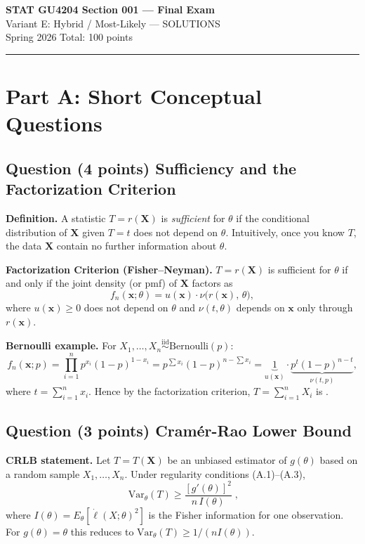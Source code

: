 \documentclass[11pt]{article}
\newcounter{qnum}
\newcommand{\question}[2]{\stepcounter{qnum}\subsection*{Question \theqnum \quad (#1 points) \hfill #2}}
\begin{document}
\begin{center}
{\LARGE\bfseries STAT GU4204 Section 001 --- Final Exam}\\[4pt]
{\large Variant E: Hybrid / Most-Likely \quad --- \quad SOLUTIONS}\\[6pt]
{\large Spring 2026 \hspace{1.5cm} Total: 100 points}
\end{center}

\bigskip
\hrule
\bigskip

\section*{Part A: Short Conceptual Questions}

\question{4}{Sufficiency and the Factorization Criterion}

\textbf{Definition.} A statistic $T = r(\mathbf{X})$ is \emph{sufficient} for $\theta$ if the conditional distribution of $\mathbf{X}$ given $T = t$ does not depend on $\theta$. Intuitively, once you know $T$, the data $\mathbf{X}$ contain no further information about $\theta$.

\textbf{Factorization Criterion (Fisher--Neyman).} $T = r(\mathbf{X})$ is sufficient for $\theta$ if and only if the joint density (or pmf) of $\mathbf{X}$ factors as
\[ f_n(\mathbf{x};\theta) = u(\mathbf{x}) \cdot \nu\bigl(r(\mathbf{x}),\,\theta\bigr), \]
where $u(\mathbf{x}) \ge 0$ does not depend on $\theta$ and $\nu(t,\theta)$ depends on $\mathbf{x}$ only through $r(\mathbf{x})$.

\textbf{Bernoulli example.} For $X_1,\ldots,X_n \stackrel{\text{iid}}{\sim} \mathrm{Bernoulli}(p)$:
\[
f_n(\mathbf{x};p) = \prod_{i=1}^n p^{x_i}(1-p)^{1-x_i}
= p^{\sum x_i}(1-p)^{n-\sum x_i}
= \underbrace{1}_{u(\mathbf{x})} \cdot \underbrace{p^{t}(1-p)^{n-t}}_{\nu(t,p)},
\]
where $t = \sum_{i=1}^n x_i$. Hence by the factorization criterion, $T = \sum_{i=1}^n X_i$ is .

\question{3}{Cram\'er-Rao Lower Bound}

\textbf{CRLB statement.} Let $T = T(\mathbf{X})$ be an unbiased estimator of $g(\theta)$ based on a random sample $X_1,\ldots,X_n$. Under regularity conditions (A.1)--(A.3),
\[ \boxed{\;\mathrm{Var}_\theta(T) \ge \frac{[g'(\theta)]^2}{n\, I(\theta)}\;,} \]
where $I(\theta) = E_\theta[\dot\ell(X;\theta)^2]$ is the Fisher information for one observation. For $g(\theta)=\theta$ this reduces to $\mathrm{Var}_\theta(T) \ge 1/(n I(\theta))$.
\end{document}

